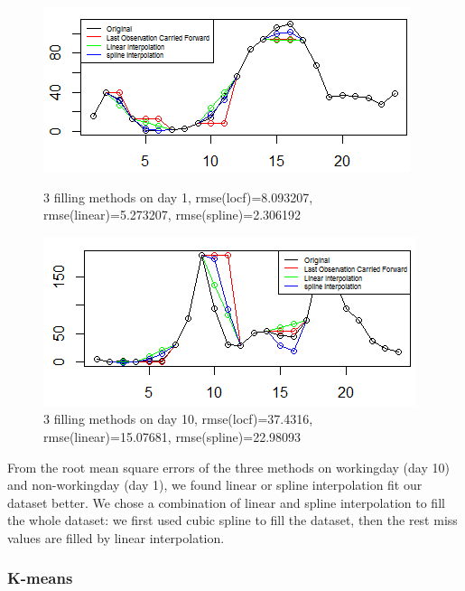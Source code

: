 \documentclass[12pt]{article}
\begin{document}
	\begin{figure}[H]
		\centering
		\begin{minipage}{.45\textwidth}
			\centering
			\includegraphics[width=\linewidth]{figures/day1_missing_value.png}
			\caption{3 filling methods on day 1, rmse(locf)=8.093207, rmse(linear)=5.273207, rmse(spline)=2.306192}
		\end{minipage}%
		\begin{minipage}{.42\textwidth}
			\centering
			\includegraphics[width=\linewidth]{figures/day10_missing_value.png}
			\caption{ 3 filling methods on day 10, rmse(locf)=37.4316, rmse(linear)=15.07681, rmse(spline)=22.98093}
			
		\end{minipage}
	\end{figure}
 From the root mean square errors of the three methods on workingday (day 10) and non-workingday (day 1), we found linear or spline interpolation fit our dataset better. We chose a combination of linear and spline interpolation to fill the whole dataset: we first used cubic spline to fill the dataset, then the rest miss values are filled by linear interpolation.
\subsubsection{K-means}	
\end{document}
